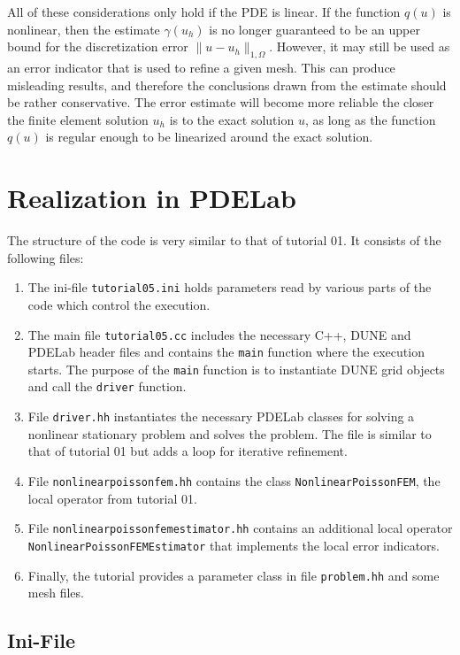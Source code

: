 \documentclass[a4paper,12pt]{article}
\begin{document}
All of these considerations only hold if the PDE is linear. If the function $q(u)$ is nonlinear,
then the estimate $\gamma(u_h)$ is no longer guaranteed to be an upper bound for the discretization
error $\|u-u_h\|_{1,\Omega}$. However, it may still be used as an error indicator that is used to
refine a given mesh. This can produce misleading results, and therefore the conclusions drawn from
the estimate should be rather conservative. The error estimate will become more reliable the closer
the finite element solution $u_h$ is to the exact solution $u$, as long as the function $q(u)$ is
regular enough to be linearized around the exact solution.

\section{Realization in PDELab}

The structure of the code is very similar to that of tutorial 01. It consists of the following
files:
\begin{enumerate}[1)]
\item The ini-file
\lstinline{tutorial05.ini} holds parameters read by various parts of the code
which control the execution. 
\item The main file \lstinline{tutorial05.cc} includes the necessary C++,
DUNE and PDELab header files
and contains the \lstinline{main} function where the execution starts. 
The purpose of the \lstinline{main} function is
to instantiate DUNE grid objects and call the \lstinline{driver} function.
\item File \lstinline{driver.hh} instantiates the necessary PDELab classes 
for solving a nonlinear stationary problem and solves the problem. The file is similar
to that of tutorial 01 but adds a loop for iterative refinement.
\item File \lstinline{nonlinearpoissonfem.hh} contains the class
\lstinline{NonlinearPoissonFEM}, the local operator from tutorial 01.
\item File \lstinline{nonlinearpoissonfemestimator.hh} contains an additional local operator
  \lstinline{NonlinearPoissonFEMEstimator} that implements the local error indicators.
\item Finally, the tutorial provides a parameter class in file \lstinline{problem.hh}
and some mesh files.
\end{enumerate}

\subsection{Ini-File}
\end{document}
